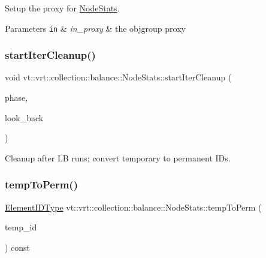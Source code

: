 Setup the proxy for {\ttfamily \hyperlink{structvt_1_1vrt_1_1collection_1_1balance_1_1_node_stats}{Node\+Stats}}. 


\begin{DoxyParams}[1]{Parameters}
\mbox{\tt in}  & {\em in\+\_\+proxy} & the objgroup proxy \\
\hline
\end{DoxyParams}
\mbox{\label{structvt_1_1vrt_1_1collection_1_1balance_1_1_node_stats_ae76790d41701769b86ef15e4924d661d}} 
\subsubsection{\texorpdfstring{start\+Iter\+Cleanup()}{startIterCleanup()}}
{\footnotesize\ttfamily void vt\+::vrt\+::collection\+::balance\+::\+Node\+Stats\+::start\+Iter\+Cleanup (\begin{DoxyParamCaption}\item[{\hyperlink{namespacevt_a46ce6733d5cdbd735d561b7b4029f6d7}{Phase\+Type}}]{phase,  }\item[{unsigned int}]{look\+\_\+back }\end{DoxyParamCaption})}



Cleanup after LB runs; convert temporary to permanent I\+Ds. 

\mbox{\label{structvt_1_1vrt_1_1collection_1_1balance_1_1_node_stats_a259d49b9aa4759b9d94be3e093fa2e6b}} 
\subsubsection{\texorpdfstring{temp\+To\+Perm()}{tempToPerm()}}
{\footnotesize\ttfamily \hyperlink{namespacevt_1_1vrt_1_1collection_1_1balance_a14c8d2c972f2913aa3f1636e5be0a120}{Element\+I\+D\+Type} vt\+::vrt\+::collection\+::balance\+::\+Node\+Stats\+::temp\+To\+Perm (\begin{DoxyParamCaption}\item[{\hyperlink{namespacevt_1_1vrt_1_1collection_1_1balance_a14c8d2c972f2913aa3f1636e5be0a120}{Element\+I\+D\+Type}}]{temp\+\_\+id }\end{DoxyParamCaption}) const}



